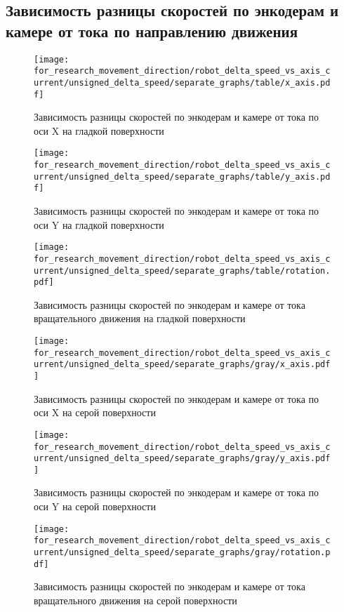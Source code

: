 \subsection{Зависимость разницы скоростей по энкодерам и камере от тока по направлению движения}

\begin{figure}[H]
    \centering
    \texttt{[image: for\_research\_movement\_direction/robot\_delta\_speed\_vs\_axis\_current/unsigned\_delta\_speed/separate\_graphs/table/x\_axis.pdf]}
    \caption{Зависимость разницы скоростей по энкодерам и камере от тока по оси X на гладкой поверхности}
\end{figure}

\begin{figure}[H]
    \centering
    \texttt{[image: for\_research\_movement\_direction/robot\_delta\_speed\_vs\_axis\_current/unsigned\_delta\_speed/separate\_graphs/table/y\_axis.pdf]}
    \caption{Зависимость разницы скоростей по энкодерам и камере от тока по оси Y на гладкой поверхности}
\end{figure}

\begin{figure}[H]
    \centering
    \texttt{[image: for\_research\_movement\_direction/robot\_delta\_speed\_vs\_axis\_current/unsigned\_delta\_speed/separate\_graphs/table/rotation.pdf]}
    \caption{Зависимость разницы скоростей по энкодерам и камере от тока вращательного движения на гладкой поверхности}
\end{figure}

\begin{figure}[H]
    \centering
    \texttt{[image: for\_research\_movement\_direction/robot\_delta\_speed\_vs\_axis\_current/unsigned\_delta\_speed/separate\_graphs/gray/x\_axis.pdf]}
    \caption{Зависимость разницы скоростей по энкодерам и камере от тока по оси X на серой поверхности}
\end{figure}

\begin{figure}[H]
    \centering
    \texttt{[image: for\_research\_movement\_direction/robot\_delta\_speed\_vs\_axis\_current/unsigned\_delta\_speed/separate\_graphs/gray/y\_axis.pdf]}
    \caption{Зависимость разницы скоростей по энкодерам и камере от тока по оси Y на серой поверхности}
\end{figure}

\begin{figure}[H]
    \centering
    \texttt{[image: for\_research\_movement\_direction/robot\_delta\_speed\_vs\_axis\_current/unsigned\_delta\_speed/separate\_graphs/gray/rotation.pdf]}
    \caption{Зависимость разницы скоростей по энкодерам и камере от тока вращательного движения на серой поверхности}
\end{figure}

